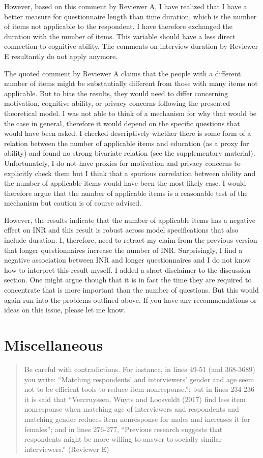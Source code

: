 \documentclass[a4paper, 12pt]{article}
\begin{document}
However, based on this comment by Reviewer A, I have realized that I have a better measure for questionnaire length than time duration, which is the number of items not applicable to the respondent. I have therefore exchanged the duration with the number of items. This variable should have a less direct connection to cognitive ability. The comments on interview duration by Reviewer E resultantly do not apply anymore.

The quoted comment by Reviewer A claims that the people with a different number of items might be substantially different from those with many items not applicable. But to bias the results, they would need to differ concerning motivation, cognitive ability, or privacy concerns following the presented theoretical model. I was not able to think of a mechanism for why that would be the case in general, therefore it would depend on the specific questions that would have been asked. I checked descriptively whether there is some form of a relation between the number of applicable items and education (as a proxy for ability) and found no strong bivariate relation (see the supplementary material). Unfortunately, I do not have proxies for motivation and privacy concerns to explicitly check them but I think that a spurious correlation between ability and the number of applicable items would have been the most likely case. I would therefore argue that the number of applicable items is a reasonable test of the mechanism but caution is of course advised.

However, the results indicate that the number of applicable items has a negative effect on INR and this result is robust across model specifications that also include duration. I, therefore, need to retract my claim from the previous version that longer questionnaires increase the number of INR. Surprisingly, I find a negative association between INR and longer questionnaires and I do not know how to interpret this result myself. I added a short disclaimer to the discussion section. One might argue though that it is in fact the time they are required to concentrate that is more important than the number of questions. But this would again run into the problems outlined above. If you have any recommendations or ideas on this issue, please let me know.


\section{Miscellaneous}

\begin{quotation}
 Be careful with contradictions. For instance, in lines 49-51 (and 368-3689) you write: “Matching respondents’ and interviewers’ gender and age seem not to be efficient tools to reduce item nonresponse.”; but in lines 234-236 it is said that “Vercruyssen, Wuyts and Loosveldt (2017) find less item nonresponse when matching age of interviewers and respondents and matching gender reduces item nonresponse for males and increases it for females”; and in lines 276-277, “Previous research suggests that respondents might be more willing to answer to socially similar interviewers.” (Reviewer E)
\end{quotation}
\end{document}

